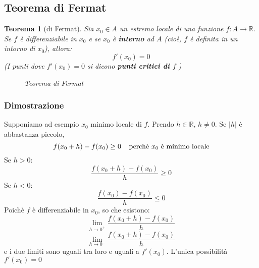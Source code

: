 \documentclass[a4paper]{article}
\newtheorem{theorem}{Teorema}
\theoremstyle{break}
\theoremstyle{break}
\theoremstyle{break}
\theoremstyle{break}
\begin{document}
\subsection{Teorema di Fermat}
\begin{theorem}[di Fermat]
  Sia \( x_0 \in A \) un estremo locale di una funzione \( f: A \to \mathbb{R} \).
  Se \( f \) è differenziabile in \( x_0 \) e se \( x_0 \) è \textbf{interno} ad \( A \)
  (cioè, \( f \) è definita in un intorno di \( x_0 \)), allora:
  \[
    f'(x_0)=0
  \] 
  (I punti dove \( f'(x_0)=0 \) si dicono \textbf{punti critici di \( f \) })
  \begin{figure}[H]
    \begin{center}
    \end{center}
    \caption{Teorema di Fermat}
  \end{figure}
\end{theorem}

\subsubsection{Dimostrazione}
Supponiamo ad esempio \( x_0 \) minimo locale di \( f \). Prendo \( h \in \mathbb{R} \),
\( h \neq 0 \). Se \( |h| \) è abbastanza piccolo,
\[
  f(x_0+h)-f(x_0) \ge 0\;\;\;\;\text{perchè \( x_0 \) è minimo locale}
\] 
Se \( h > 0 \):
\[
  \frac{f(x_0+h) - f(x_0)}{h} \ge 0
\] 
Se \( h < 0 \):
\[
  \frac{f(x_0)-f(x_0)}{h} \le 0
\] 
Poichè \( f \) è differenziabile in \( x_0 \), so che esistono:
\[
  \lim_{h \to 0^+} \frac{f(x_0 + h) - f(x_0)}{h} 
\] 
\[
  \lim_{h \to 0^-} \frac{f(x_0 + h) - f(x_0)}{h} 
\] 
e i due limiti sono uguali tra loro e uguali a \( f'(x_0) \). L'unica possibilità \( f'(x_0)=0 \) 
\end{document}
